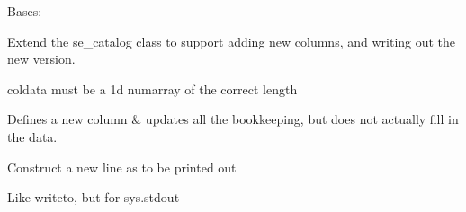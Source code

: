 \documentclass[letterpaper,10pt,english]{sphinxmanual}
\begin{document}
\begin{fulllineitems}
\label{SamPy.smnIO:SamPy.smnIO.sextutils.rw_catalog}
Bases: {\hyperref[SamPy.smnIO:SamPy.smnIO.sextutils.se_catalog]{}}

Extend the se\_catalog class to support adding new columns,
and writing out the new version.


\begin{fulllineitems}
\label{SamPy.smnIO:SamPy.smnIO.sextutils.rw_catalog.addcolumn}
coldata must be a 1d numarray of the correct length

\end{fulllineitems}



\begin{fulllineitems}
\label{SamPy.smnIO:SamPy.smnIO.sextutils.rw_catalog.addemptycolumn}
Defines a new column \& updates all the bookkeeping, but
does not actually fill in the data.

\end{fulllineitems}



\begin{fulllineitems}
\label{SamPy.smnIO:SamPy.smnIO.sextutils.rw_catalog.line}
Construct a new line as to be printed out

\end{fulllineitems}



\begin{fulllineitems}
\label{SamPy.smnIO:SamPy.smnIO.sextutils.rw_catalog.printme}
Like writeto, but for sys.stdout

\end{fulllineitems}



\begin{fulllineitems}
\label{SamPy.smnIO:SamPy.smnIO.sextutils.rw_catalog.writeto}
\end{fulllineitems}


\end{fulllineitems}
\end{document}
